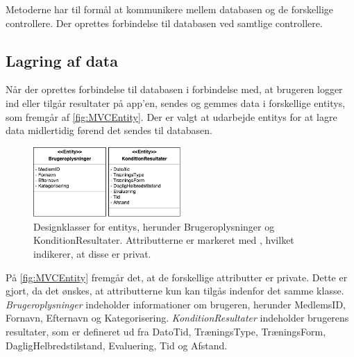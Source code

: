 Metoderne har til formål at kommunikere mellem databasen og de forskellige controllere. Der oprettes forbindelse til databasen ved samtlige controllere. 

\subsection*{Lagring af data}  \label{sec:entity}
Når der oprettes forbindelse til databasen i forbindelse med, at brugeren logger ind eller tilgår resultater på app'en, sendes og gemmes data i forskellige entitys, som fremgår af \autoref{fig:MVCEntity}. Der er valgt at udarbejde entitys for at lagre data midlertidig førend det sendes til databasen. 

\begin{figure} [H]
\centering
\includegraphics[width=0.5\textwidth]{figures/MVC/Entity}
\caption{Designklasser for entitys, herunder Brugeroplysninger og KonditionResultater. Attributterne er markeret med \-, hvilket indikerer, at disse er privat.}
\label{fig:MVCEntity}
\end{figure}

\noindent
På \autoref{fig:MVCEntity} fremgår det, at de forskellige attributter er private. Dette er gjort, da det ønskes, at attributterne kun kan tilgås indenfor det samme klasse. 
\textit{Brugeroplysninger} indeholder informationer om brugeren, herunder MedlemsID, Fornavn, Efternavn og Kategorisering. 
\textit{KonditionResultater} indeholder brugerens resultater, som er defineret ud fra DatoTid, TræningsType, TræningsForm, DagligHelbredstilstand, Evaluering, Tid og Afstand. 
